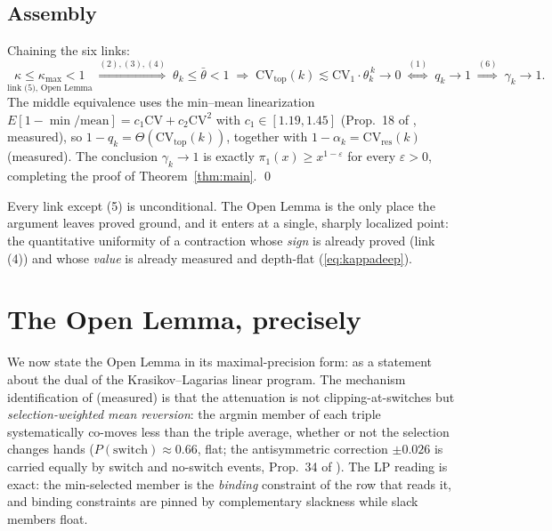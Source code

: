 \documentclass[11pt]{article}
\theoremstyle{definition}
\theoremstyle{remark}
\newcommand{\CV}{\mathrm{CV}}
\newcommand{\gam}{\gamma}
\newcommand{\kap}{\kappa}
\begin{document}
\subsection{Assembly}
\label{sec:assembly}

Chaining the six links:
\begin{equation}
\underset{\text{link (5), Open Lemma}}{\kap \leq \kap_{\max} < 1}
\;\overset{(2),(3),(4)}{\Longrightarrow}\;
\theta_k \leq \bar\theta < 1
\;\Longrightarrow\;
\CV_{\mathrm{top}}(k) \lesssim \CV_1 \cdot \theta_k^{\,k} \to 0
\;\overset{(1)}{\Longleftrightarrow}\;
q_k \to 1
\;\overset{(6)}{\Longrightarrow}\;
\gam_k \to 1 .
\label{eq:chain}
\end{equation}
The middle equivalence uses the min--mean linearization
$E[1 - \min/\mathrm{mean}] = c_1 \CV + c_2 \CV^2$ with $c_1 \in [1.19, 1.45]$
(Prop.~18 of \cite{NOTE}, measured), so $1 - q_k = \Theta(\CV_{\mathrm{top}}(k))$,
together with $1 - \alpha_k = \CV_{\mathrm{res}}(k)$ (measured). The conclusion
$\gam_k \to 1$ is exactly $\pi_1(x) \geq x^{1-\varepsilon}$ for every
$\varepsilon > 0$, completing the proof of Theorem~\ref{thm:main}. \qed

Every link except (5) is unconditional. The Open Lemma is the only place the
argument leaves proved ground, and it enters at a single, sharply localized
point: the quantitative uniformity of a contraction whose \emph{sign} is
already proved (link (4)) and whose \emph{value} is already measured and
depth-flat (\eqref{eq:kappadeep}).

\section{The Open Lemma, precisely}
\label{sec:openlemma}

We now state the Open Lemma in its maximal-precision form: as a statement about
the dual of the Krasikov--Lagarias linear program. The mechanism identification
of \cite{Drift26} (measured) is that the attenuation is not clipping-at-switches
but \emph{selection-weighted mean reversion}: the argmin member of each triple
systematically co-moves less than the triple average, whether or not the
selection changes hands ($P(\mathrm{switch}) \approx 0.66$, flat; the
antisymmetric correction $\pm 0.026$ is carried equally by switch and no-switch
events, Prop.~34 of \cite{NOTE}). The LP reading is exact: the min-selected
member is the \emph{binding} constraint of the row that reads it, and binding
constraints are pinned by complementary slackness while slack members float.
\end{document}

